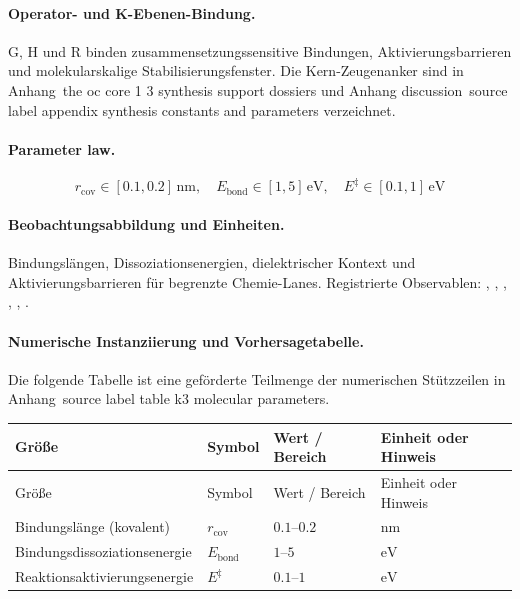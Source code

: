 \paragraph{Operator- und K-Ebenen-Bindung.}
G, H und R binden zusammensetzungssensitive Bindungen, Aktivierungsbarrieren und molekularskalige Stabilisierungsfenster.
Die Kern-Zeugenanker sind in Anhang~the oc core 1 3 synthesis support dossiers und Anhang discussion~source label appendix synthesis constants and parameters verzeichnet.

\paragraph{Parameter law.}
\[
r_{\mathrm{cov}} \in [0.1, 0.2]\,\mathrm{nm},\quad E_{\mathrm{bond}} \in [1, 5]\,\mathrm{eV},\quad E^\ddagger \in [0.1, 1]\,\mathrm{eV}
\]

\paragraph{Beobachtungsabbildung und Einheiten.}
Bindungslängen, Dissoziationsenergien, dielektrischer Kontext und Aktivierungsbarrieren für begrenzte Chemie-Lanes.
Registrierte Observablen: , \allowbreak {}, \allowbreak {}, \allowbreak {}, \allowbreak {}, \allowbreak {}.

\paragraph{Numerische Instanziierung und Vorhersagetabelle.}
Die folgende Tabelle ist eine geförderte Teilmenge der numerischen Stützzeilen in Anhang~source label table k3 molecular parameters.
\begin{longtable}{@{}L{0.27\textwidth}L{0.15\textwidth}L{0.24\textwidth}L{0.16\textwidth}@{}}
\toprule
Größe & Symbol & Wert / Bereich & Einheit oder Hinweis \\
\midrule
\endfirsthead
\toprule
Größe & Symbol & Wert / Bereich & Einheit oder Hinweis \\
\midrule
\endhead
Bindungslänge (kovalent) & $\scriptstyle r_{\mathrm{cov}}$ & $0.1\text{--}0.2$ & $\mathrm{nm}$ \\
Bindungsdissoziationsenergie & $\scriptstyle E_{\mathrm{bond}}$ & $1\text{--}5$ & $\mathrm{eV}$ \\
Reaktionsaktivierungsenergie & $\scriptstyle E^\ddagger$ & $0.1\text{--}1$ & $\mathrm{eV}$ \\
\bottomrule
\end{longtable}

